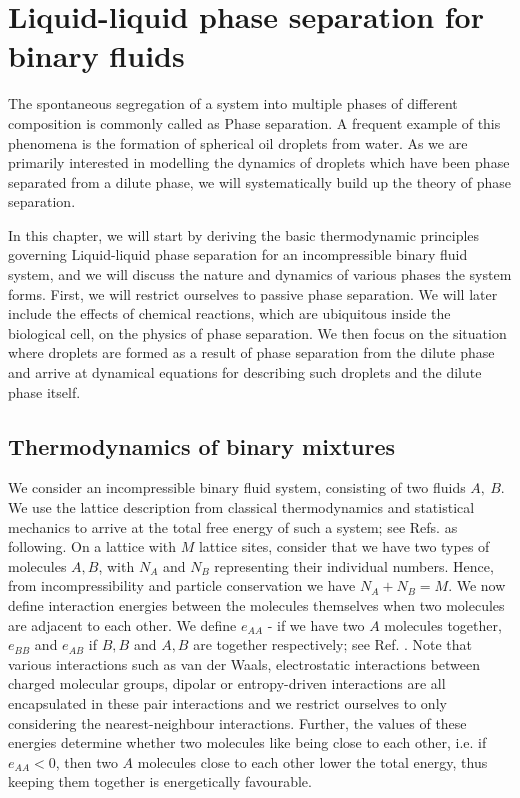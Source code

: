 \onehalfspacing

\chapter{Liquid-liquid phase separation for binary fluids}
\label{chap:Chapter_2}

The spontaneous segregation of a system into multiple phases of different composition is commonly called as Phase separation.
A frequent example of this phenomena is the formation of spherical oil droplets from water.
As we are primarily interested in modelling the dynamics of droplets which have been phase separated from a dilute phase, we will systematically build up the theory of phase separation.

In this chapter, we will start by deriving the basic thermodynamic principles governing Liquid-liquid phase separation for an incompressible binary fluid system, and we will discuss the nature and dynamics of various phases the system forms. 
First, we will restrict ourselves to passive phase separation.
We will later include the effects of chemical reactions, which are ubiquitous inside the biological cell, on the physics of phase separation.
We then focus on the situation where droplets are formed as a result of phase separation from the dilute phase and arrive at dynamical equations for describing such droplets and the dilute phase itself. 

\section{Thermodynamics of binary mixtures}
We consider an incompressible binary fluid system, consisting of two fluids $A,~B$.
We use the lattice description from classical thermodynamics and statistical mechanics to arrive at the total free energy of such a system; see Refs. \cite{balian2007microphysics1,balian2007microphysics2} as following.
On a lattice with $M$ lattice sites, consider that we have two types of molecules $A, B$, with $N_A$ and $N_B$ representing their individual numbers.
Hence, from incompressibility and particle conservation we have $N_A + N_B = M$.
We now define interaction energies between the molecules themselves when two molecules are adjacent to each other.
We define $e_{AA}$ - if we have two $A$ molecules together, $e_{BB}$ and $e_{AB}$ if $B,B$ and $A,B$ are together respectively; see Ref. \cite{Review2019}.
Note that various interactions such as van der Waals, electrostatic interactions between charged molecular groups, dipolar or entropy-driven interactions are all encapsulated in these pair interactions and we restrict ourselves to only considering the nearest-neighbour interactions. 
Further, the values of these energies determine whether two molecules like being close to each other, i.e. if $e_{AA} < 0$, then two $A$ molecules close to each other lower the total energy, thus keeping them together is energetically favourable.

